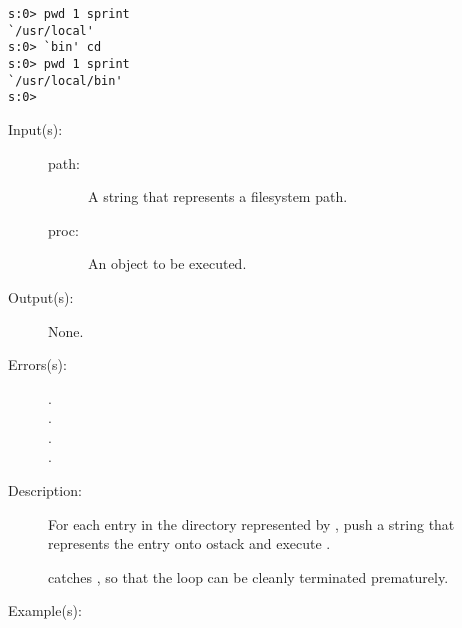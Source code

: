 \begin{description}
\begin{description}
\begin{verbatim}
s:0> pwd 1 sprint
`/usr/local'
s:0> `bin' cd
s:0> pwd 1 sprint
`/usr/local/bin'
s:0>
		\end{verbatim}
	\end{description}
\label{systemdict:dirforeach}
\item[{\stilop{path proc}{dirforeach}{--}}: ]
	\begin{description}\item[]
	\item[Input(s): ]
		\begin{description}\item[]
		\item[path: ]
			A string that represents a filesystem path.
		\item[proc: ]
			An object to be executed.
		\end{description}
	\item[Output(s): ] None.
	\item[Errors(s): ]
		\begin{description}\item[]
		\item[.]
		\item[.]
		\item[.]
		\item[.]
		\end{description}
	\item[Description: ]
		For each entry in the directory represented by ,
		push a string that represents the entry onto ostack and
		execute .

		 catches , so that the
		loop can be cleanly terminated prematurely.
	\item[Example(s): ]\begin{verbatim}


\end{verbatim}
\end{description}
\end{description}
